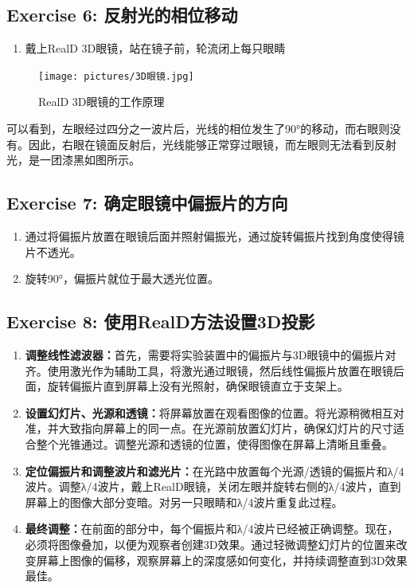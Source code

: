 \documentclass{ctexart}
\begin{document}
\subsection{Exercise 6: 反射光的相位移动}
\begin{enumerate}
    \item 戴上RealD 3D眼镜，站在镜子前，轮流闭上每只眼睛
\end{enumerate}
\begin{figure}[H]
    \centering
    \texttt{[image: pictures/3D眼镜.jpg]}
    \caption{RealD 3D眼镜的工作原理}
\end{figure}
可以看到，左眼经过四分之一波片后，光线的相位发生了90°的移动，而右眼则没有。因此，右眼在镜面反射后，光线能够正常穿过眼镜，而左眼则无法看到反射光，是一团漆黑如图所示。
\subsection{Exercise 7: 确定眼镜中偏振片的方向}
\begin{enumerate}
    \item 通过将偏振片放置在眼镜后面并照射偏振光，通过旋转偏振片找到角度使得镜片不透光。
    \item 旋转90°，偏振片就位于最大透光位置。
\end{enumerate}

\subsection{Exercise 8: 使用RealD方法设置3D投影}
\begin{enumerate}
    \item \textbf{调整线性滤波器：}首先，需要将实验装置中的偏振片与3D眼镜中的偏振片对齐。使用激光作为辅助工具，将激光通过眼镜，然后线性偏振片放置在眼镜后面，旋转偏振片直到屏幕上没有光照射，确保眼镜直立于支架上。

    \item \textbf{设置幻灯片、光源和透镜：}将屏幕放置在观看图像的位置。将光源稍微相互对准，并大致指向屏幕上的同一点。在光源前放置幻灯片，确保幻灯片的尺寸适合整个光锥通过。调整光源和透镜的位置，使得图像在屏幕上清晰且重叠。

    \item \textbf{定位偏振片和调整波片和滤光片：}在光路中放置每个光源/透镜的偏振片和λ/4波片。调整λ/4波片，戴上RealD眼镜，关闭左眼并旋转右侧的λ/4波片，直到屏幕上的图像大部分变暗。对另一只眼睛和λ/4波片重复此过程。

    \item \textbf{最终调整：}在前面的部分中，每个偏振片和λ/4波片已经被正确调整。现在，必须将图像叠加，以便为观察者创建3D效果。通过轻微调整幻灯片的位置来改变屏幕上图像的偏移，观察屏幕上的深度感如何变化，并持续调整直到3D效果最佳。
\end{enumerate}
\end{document}
